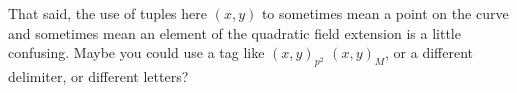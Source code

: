 \documentclass{article}
\renewcommand{\>}{\quad\nobreak$\longrightarrow$\quad}
\begin{document}
\begin{description}
        That said, the use of tuples here $(x, y)$ to sometimes mean
         a point on the curve and sometimes mean an element of the
         quadratic field extension is a little confusing.
        Maybe you could use a tag like $(x, y)_{p^2}$ \vs $(x, y)_M$,
         or a different delimiter, or different letters?

\end{description}
\end{document}
